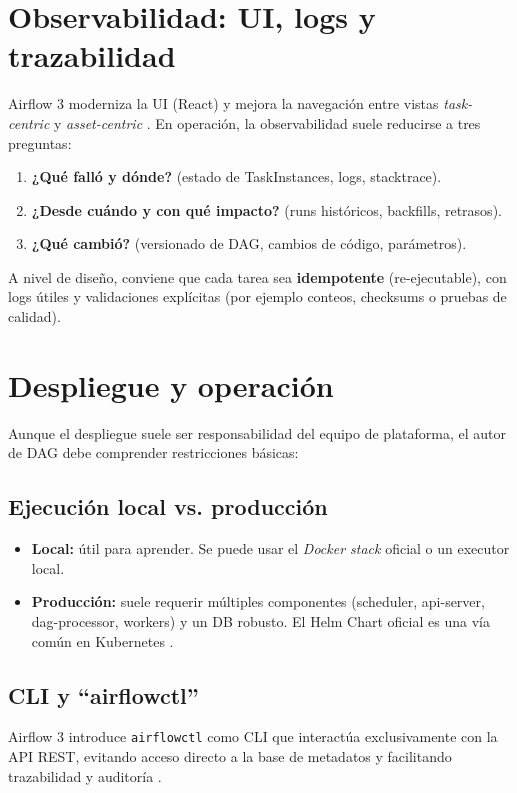 \section{Observabilidad: UI, logs y trazabilidad}
Airflow 3 moderniza la UI (React) y mejora la navegación entre vistas \textit{task-centric} y \textit{asset-centric} \cite{airflow_blog_3_ga}. En operación, la observabilidad suele reducirse a tres preguntas:
\begin{enumerate}[leftmargin=*]
  \item \textbf{¿Qué falló y dónde?} (estado de TaskInstances, logs, stacktrace).
  \item \textbf{¿Desde cuándo y con qué impacto?} (runs históricos, backfills, retrasos).
  \item \textbf{¿Qué cambió?} (versionado de DAG, cambios de código, parámetros).
\end{enumerate}
A nivel de diseño, conviene que cada tarea sea \textbf{idempotente} (re-ejecutable), con logs útiles y validaciones explícitas (por ejemplo conteos, checksums o pruebas de calidad).

\section{Despliegue y operación}
Aunque el despliegue suele ser responsabilidad del equipo de plataforma, el autor de DAG debe comprender restricciones básicas:

\subsection{Ejecución local vs. producción}
\begin{itemize}[leftmargin=*]
  \item \textbf{Local:} útil para aprender. Se puede usar el \textit{Docker stack} oficial o un executor local.
  \item \textbf{Producción:} suele requerir múltiples componentes (scheduler, api-server, dag-processor, workers) y un DB robusto. El Helm Chart oficial es una vía común en Kubernetes \cite{airflow_docs}.
\end{itemize}

\subsection{CLI y ``airflowctl''}
Airflow 3 introduce \texttt{airflowctl} como CLI que interactúa exclusivamente con la API REST, evitando acceso directo a la base de metadatos y facilitando trazabilidad y auditoría \cite{airflow_docs}.

